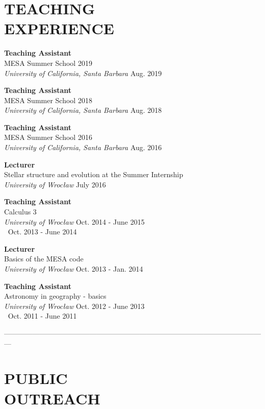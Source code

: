 \documentclass[margin, 10pt]{res} %
\begin{document}
\begin{resume}
\section{TEACHING \\ EXPERIENCE}  

{\bf Teaching Assistant} \\
MESA Summer School 2019 \\
{\sl University of California, Santa Barbara} \hfill Aug. 2019

{\bf Teaching Assistant} \\
MESA Summer School 2018 \\
{\sl University of California, Santa Barbara} \hfill Aug. 2018

{\bf Teaching Assistant} \\
MESA Summer School 2016 \\
{\sl University of California, Santa Barbara} \hfill Aug. 2016

{\bf Lecturer} \\
Stellar structure and evolution at the Summer Internship \\
{\sl University of Wroc\l{}aw} \hfill July 2016

{\bf Teaching Assistant} \\
Calculus 3 \\
{\sl University of Wroc\l{}aw }\hfill Oct. 2014 - June 2015 \\
$~$ \hfill Oct. 2013 - June 2014

{\bf Lecturer} \\
Basics of the MESA code \\
{\sl University of Wroc\l{}aw} \hfill Oct. 2013 - Jan. 2014

{\bf Teaching Assistant} \\
Astronomy in geography - basics \\
{\sl University of Wroc\l{}aw} \hfill Oct. 2012 - June 2013 \\
$~$ \hfill Oct. 2011 - June 2011

---------------------------------------------------------------------------------------------------------------

\section{PUBLIC \\ OUTREACH}  


\end{resume}
\end{document}
